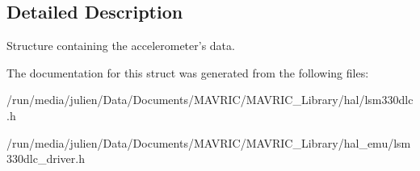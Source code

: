 \subsection{Detailed Description}
Structure containing the accelerometer's data. 

The documentation for this struct was generated from the following files\+:\begin{DoxyCompactItemize}
\item 
/run/media/julien/\+Data/\+Documents/\+M\+A\+V\+R\+I\+C/\+M\+A\+V\+R\+I\+C\+\_\+\+Library/hal/lsm330dlc.\+h\item 
/run/media/julien/\+Data/\+Documents/\+M\+A\+V\+R\+I\+C/\+M\+A\+V\+R\+I\+C\+\_\+\+Library/hal\+\_\+emu/lsm330dlc\+\_\+driver.\+h\end{DoxyCompactItemize}
